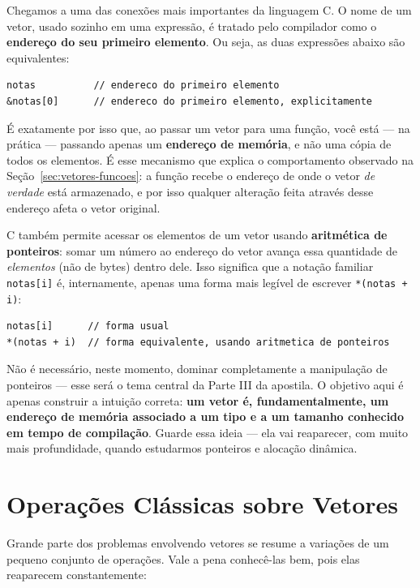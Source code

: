 \documentclass[12pt,a4paper,oneside]{extreport}
\begin{document}
Chegamos a uma das conexões mais importantes da linguagem C. O nome de um vetor, usado sozinho em uma expressão, é tratado pelo compilador como o \textbf{endereço do seu primeiro elemento}. Ou seja, as duas expressões abaixo são equivalentes:

\begin{lstlisting}
notas          // endereco do primeiro elemento
&notas[0]      // endereco do primeiro elemento, explicitamente
\end{lstlisting}

É exatamente por isso que, ao passar um vetor para uma função, você está — na prática — passando apenas um \textbf{endereço de memória}, e não uma cópia de todos os elementos. É esse mecanismo que explica o comportamento observado na Seção~\ref{sec:vetores-funcoes}: a função recebe o endereço de onde o vetor \textit{de verdade} está armazenado, e por isso qualquer alteração feita através desse endereço afeta o vetor original.

C também permite acessar os elementos de um vetor usando \textbf{aritmética de ponteiros}: somar um número ao endereço do vetor avança essa quantidade de \textit{elementos} (não de bytes) dentro dele. Isso significa que a notação familiar \texttt{notas[i]} é, internamente, apenas uma forma mais legível de escrever \texttt{*(notas + i)}:

\begin{lstlisting}
notas[i]      // forma usual
*(notas + i)  // forma equivalente, usando aritmetica de ponteiros
\end{lstlisting}

Não é necessário, neste momento, dominar completamente a manipulação de ponteiros — esse será o tema central da Parte III da apostila. O objetivo aqui é apenas construir a intuição correta: \textbf{um vetor é, fundamentalmente, um endereço de memória associado a um tipo e a um tamanho conhecido em tempo de compilação}. Guarde essa ideia — ela vai reaparecer, com muito mais profundidade, quando estudarmos ponteiros e alocação dinâmica.

\section{Operações Clássicas sobre Vetores}

Grande parte dos problemas envolvendo vetores se resume a variações de um pequeno conjunto de operações. Vale a pena conhecê-las bem, pois elas reaparecem constantemente:
\end{document}

